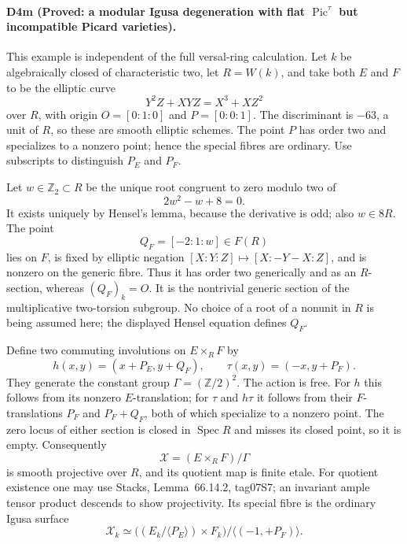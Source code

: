 \paragraph{D4m (Proved: a modular Igusa degeneration with flat
$\operatorname{Pic}^{\tau}$ but incompatible Picard varieties).}
This example is independent of the full versal-ring calculation.
Let $k$ be algebraically closed of characteristic two, let $R=W(k)$,
and take both $E$ and $F$ to be the elliptic curve
\[
 Y^2Z+XYZ=X^3+XZ^2
\]
over $R$, with origin $O=[0:1:0]$ and $P=[0:0:1]$.
The discriminant is $-63$, a unit of $R$, so these are smooth elliptic
schemes. The point $P$ has order two and specializes to a nonzero
point; hence the special fibres are ordinary. Use subscripts to
distinguish $P_E$ and $P_F$.

Let $w\in\mathbb Z_2\subset R$ be the unique root congruent to zero
modulo two of
\[
 2w^2-w+8=0.
\]
It exists uniquely by Hensel's lemma, because the derivative is odd;
also $w\in8R$. The point
\[
 Q_F=[-2:1:w]\in F(R)
\]
lies on $F$, is fixed by elliptic negation
$[X:Y:Z]\mapsto[X:-Y-X:Z]$, and is nonzero on the generic fibre.
Thus it has order two generically and as an $R$-section, whereas
$(Q_F)_k=O$. It is the nontrivial generic section of the multiplicative
two-torsion subgroup. No choice of a root of a nonunit in $R$ is
being assumed here; the displayed Hensel equation defines $Q_F$.

Define two commuting involutions on $E\times_R F$ by
\[
 h(x,y)=(x+P_E,y+Q_F),\qquad
 \tau(x,y)=(-x,y+P_F).
\]
They generate the constant group $\Gamma=(\mathbb Z/2)^2$.
The action is free. For $h$ this follows from its nonzero $E$-translation;
for $\tau$ and $h\tau$ it follows from their $F$-translations
$P_F$ and $P_F+Q_F$, both of which specialize to a nonzero point.
The zero locus of either section is closed in $\operatorname{Spec}R$
and misses its closed point, so it is empty. Consequently
\[
 \mathcal X=(E\times_R F)/\Gamma
\]
is smooth projective over $R$, and its quotient map is finite etale.
For quotient existence one may use Stacks, Lemma~66.14.2, tag07S7;
an invariant ample tensor product descends to show projectivity.
Its special fibre is the ordinary Igusa surface
\[
 \mathcal X_k\simeq
 \bigl((E_k/\langle P_E\rangle)\times F_k\bigr)
 /\langle(-1,+P_F)\rangle.                              \tag{M1}
\]

